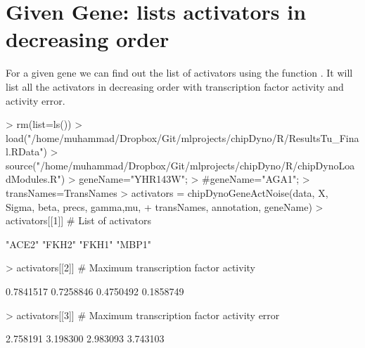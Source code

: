 \documentclass{article}
\begin{document}
\section{Given Gene: lists activators in decreasing order}
For a given gene we can find out the list of activators using the function . It will list all the activators in decreasing order with transcription factor activity and activity error.


\begin{Schunk}
\begin{Sinput}
> rm(list=ls())
> load("/home/muhammad/Dropbox/Git/mlprojects/chipDyno/R/ResultsTu_Final.RData")
> source("/home/muhammad/Dropbox/Git/mlprojects/chipDyno/R/chipDynoLoadModules.R")
> geneName="YHR143W"; 
> #geneName="AGA1"; 
> transNames=TransNames
> activators = chipDynoGeneActNoise(data, X, Sigma, beta, precs, gamma,mu, 
+                     transNames, annotation, geneName)
> activators[[1]] # List of activators
\end{Sinput}
\begin{Soutput}
[1] "ACE2" "FKH2" "FKH1" "MBP1"
\end{Soutput}
\begin{Sinput}
> activators[[2]] # Maximum transcription factor activity
\end{Sinput}
\begin{Soutput}
[1] 0.7841517 0.7258846 0.4750492 0.1858749
\end{Soutput}
\begin{Sinput}
> activators[[3]] # Maximum transcription factor activity error
\end{Sinput}
\begin{Soutput}
[1] 2.758191 3.198300 2.983093 3.743103
\end{Soutput}
\end{Schunk}



\end{document}
